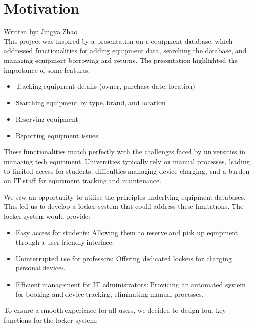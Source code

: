 \section{Motivation}
{\tiny Written by: Jingya Zhao}\\

This project was inspired by a presentation on a equipment database, which addressed functionalities for adding equipment data, searching the database, and managing equipment borrowing and returns. The presentation highlighted the importance of some features:
\begin{itemize}
    \item Tracking equipment details (owner, purchase date, location)
    \item Searching equipment by type, brand, and location
    \item Reserving equipment
    \item Reporting equipment issues
\end{itemize}

These functionalities match perfectly with the challenges faced by universities in managing tech equipment. Universities typically rely on manual processes, leading to limited access for students, difficulties managing device charging, and a burden on IT staff for equipment tracking and maintenance.

We saw an opportunity to utilise the principles underlying equipment databases. This led us to develop a locker system that could address these limitations. The locker system would provide:
\begin{itemize}
    \item Easy access for students: Allowing them to reserve and pick up equipment through a user-friendly interface.
    \item Uninterrupted use for professors: Offering dedicated lockers for charging personal devices.
    \item Efficient management for IT administrators: Providing an automated system for booking and device tracking, eliminating manual processes.
\end{itemize}

To ensure a smooth experience for all users, we decided to design four key functions for the locker system:

